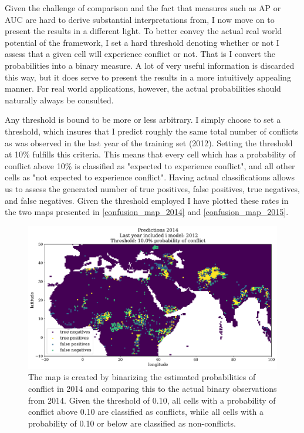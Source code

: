\documentclass[a4paper]{article}
\begin{document}

Given the challenge of comparison and the fact that measures such as AP or AUC are hard to derive substantial interpretations from, I now move on to present the results in a different light. To better convey the actual real world potential of the framework, I set a hard threshold denoting whether or not I assess that a given cell will experience conflict or not. That is I convert the probabilities into a binary measure. A lot of very useful information is discarded this way, but it does serve to present the results in a more intuitively appealing manner. For real world applications, however, the actual probabilities should naturally always be consulted.\par

Any threshold is bound to be more or less arbitrary. I simply choose to set a threshold, which insures that I predict roughly the same total number of conflicts as was observed in the last year of the training set (2012). Setting the threshold at 10\% fulfills this criteria. This means that every cell which has a probability of conflict above 10\% is classified as "expected to experience conflict", and all other cells as "not expected to experience conflict". Having actual classifications allows us to assess the generated number of true positives, false positives, true negatives, and false negatives. Given the threshold employed I have plotted these rates in the two maps presented in \autoref{confusion_map_2014} and \autoref{confusion_map_2015}.\par

\begin{figure}[!htb]
	\centering
	\includegraphics[scale=0.47]{confusion_map_2014.pdf}
    \caption{\footnotesize{The map is created by binarizing the estimated probabilities of conflict in 2014 and comparing this to the actual binary observations from 2014. Given the threshold of 0.10, all cells with a probability of conflict above 0.10 are classified as conflicts, while all cells with a probability of 0.10 or below are classified as non-conflicts.}}\label{confusion_map_2014}
\end{figure}
\end{document}
